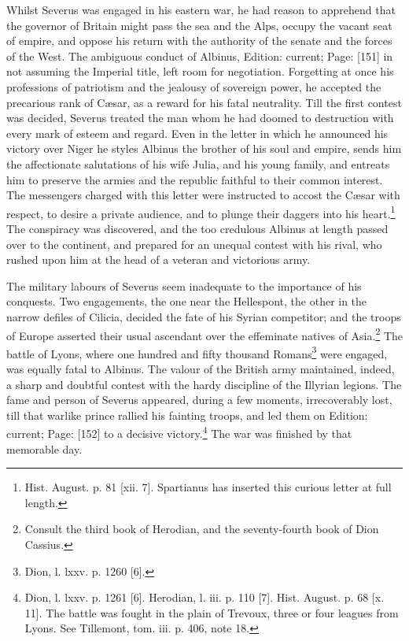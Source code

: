 Whilst Severus was engaged in his eastern war, he had reason to apprehend that the governor of Britain might pass the sea and the Alps, occupy the vacant seat of empire, and oppose his return with the authority of the senate and the forces of the West. The ambiguous conduct of Albinus, Edition: current; Page: [151] in not assuming the Imperial title, left room for negotiation. Forgetting at once his professions of patriotism and the jealousy of sovereign power, he accepted the precarious rank of Cæsar, as a reward for his fatal neutrality. Till the first contest was decided, Severus treated the man whom he had doomed to destruction with every mark of esteem and regard. Even in the letter in which he announced his victory over Niger he styles Albinus the brother of his soul and empire, sends him the affectionate salutations of his wife Julia, and his young family, and entreats him to preserve the armies and the republic faithful to their common interest. The messengers charged with this letter were instructed to accost the Cæsar with respect, to desire a private audience, and to plunge their daggers into his heart.\footnote{Hist. August. p. 81 [xii. 7]. Spartianus has inserted this curious letter at full length.} The conspiracy was discovered, and the too credulous Albinus at length passed over to the continent, and prepared for an unequal contest with his rival, who rushed upon him at the head of a veteran and victorious army.

The military labours of Severus seem inadequate to the importance of his conquests. Two engagements, the one near the Hellespont, the other in the narrow defiles of Cilicia, decided the fate of his Syrian competitor; and the troops of Europe asserted their usual ascendant over the effeminate natives of Asia.\footnote{Consult the third book of Herodian, and the seventy-fourth book of Dion Cassius.} The battle of Lyons, where one hundred and fifty thousand Romans\footnote{Dion, l. lxxv. p. 1260 [6].} were engaged, was equally fatal to Albinus. The valour of the British army maintained, indeed, a sharp and doubtful contest with the hardy discipline of the Illyrian legions. The fame and person of Severus appeared, during a few moments, irrecoverably lost, till that warlike prince rallied his fainting troops, and led them on Edition: current; Page: [152] to a decisive victory.\footnote{Dion, l. lxxv. p. 1261 [6]. Herodian, l. iii. p. 110 [7]. Hist. August. p. 68 [x. 11]. The battle was fought in the plain of Trevoux, three or four leagues from Lyons. See Tillemont, tom. iii. p. 406, note 18.} The war was finished by that memorable day.

